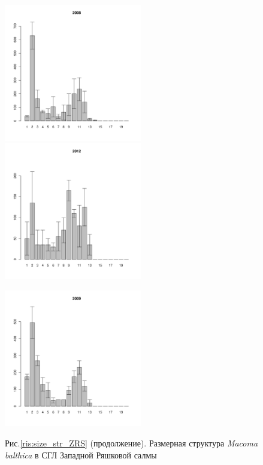 \begin{figure}[h]
\begin{multicols}{3}
\end{multicols}


\begin{multicols}{3}
\hfill
\includegraphics[width=60mm]{../White_Sea/Ryashkov_ZRS/zrs_2008_.pdf}
\hfill
\includegraphics[width=60mm]{../White_Sea/Ryashkov_ZRS/zrs_2012_.pdf}
\hfill

\end{multicols}


\begin{multicols}{3}
\hfill
\includegraphics[width=60mm]{../White_Sea/Ryashkov_ZRS/zrs_2009_.pdf}
\hfill

\end{multicols}


\begin{center}
Рис.\ref{ris:size_str_ZRS} (продолжение). Размерная структура {\it Macoma balthica} в СГЛ Западной Ряшковой салмы
\end{center}
\end{figure}

